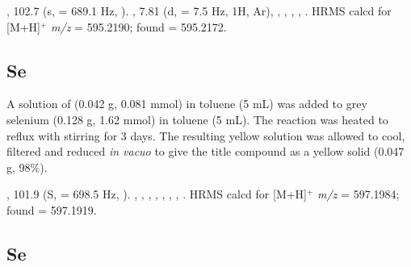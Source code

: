 ,
102.7 (s, \JPSe{} = 689.1 Hz, ).
,
7.81 (d, \J{} = 7.5 Hz, 1H, Ar),
,
,
,
,
.
HRMS calcd for  [M+H]$^+$ \emph{m/z} = 595.2190; found = 595.2172.


\subsection*{\tBuThixantphos{}Se}

A solution of \tButhixantphos{} (0.042 g, 0.081 mmol) in toluene (5 mL) was added to grey selenium (0.128 g, 1.62 mmol) in toluene (5 mL).  The reaction was heated to reflux with stirring for 3 days.  The resulting yellow solution was allowed to cool, filtered and reduced \emph{in vacuo} to give the title compound as a yellow solid (0.047 g, 98\%).   

,
101.9 (S, \JPSe{} = 698.5 Hz, ).
,
,
,
,
,
,
,
.
HRMS calcd for  [M+H]$^+$ \emph{m/z} = 597.1984; found = 597.1919.


\subsection*{\tBuXantphos{}Se}


